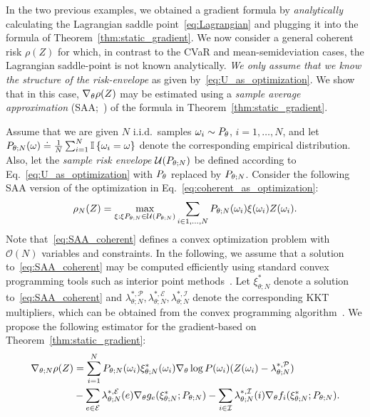 \documentclass{article} %
\newcommand{\citealt}{\cite}
\begin{document}
In the two previous examples, we obtained a gradient formula by \emph{analytically} calculating the Lagrangian saddle point~\eqref{eq:Lagrangian} and plugging it into the formula of Theorem~\ref{thm:static_gradient}. We now consider a general coherent risk $\rho(Z)$ for which, in contrast to the CVaR and mean-semideviation cases, the Lagrangian saddle-point is not known analytically. \emph{We only assume that we know the structure of the risk-envelope} as given by~\eqref{eq:U_as_optimization}.
We show that in this case, $\nabla_{\theta} \rho(Z)$ may be estimated using a \emph{sample average approximation} (SAA;~\citealt{Shapiro2009}) of the formula in Theorem~\ref{thm:static_gradient}.

Assume that we are given $N$ i.i.d.~samples $\omega_i \sim P_{\theta}$, $i=1,\dots,N$, and let $P_{\theta;N}(\omega) \doteq \frac{1}{N}\sum_{i=1}^N \mathbb{I}\left\{ { \omega_i = \omega } \right\}$ denote the corresponding empirical distribution. Also, let the \emph{sample risk envelope} $\mathcal U(P_{\theta;N})$ be defined according to Eq.~\ref{eq:U_as_optimization} with $P_{\theta}$ replaced by $P_{\theta;N}$. Consider the following SAA version of the optimization in Eq.~\ref{eq:coherent_as_optimization}:
%
\begin{equation}\label{eq:SAA_coherent}
\rho_N(Z) = \max_{\xi:\xi P_{\theta;N} \in \mathcal U(P_{\theta;N})} \sum_{i \in 1,\dots,N} P_{\theta;N}(\omega_i) \xi(\omega_i) Z(\omega_i).
\end{equation}
%
Note that~\eqref{eq:SAA_coherent} defines a convex optimization problem with $\mathcal O(N)$ variables and constraints. In the following, we assume that a solution to~\eqref{eq:SAA_coherent} may be computed efficiently using standard convex programming tools such as interior point methods~\cite{boyd2009convex}. Let $\xi^*_{\theta;N}$ denote a solution to~\eqref{eq:SAA_coherent} and $\lambda^{*,\mathcal P}_{\theta;N},\lambda^{*,\mathcal E}_{\theta;N},\lambda^{*,\mathcal I}_{\theta;N}$ denote the corresponding KKT multipliers, which can be obtained from the convex programming algorithm~\cite{boyd2009convex}. We propose the following estimator for the gradient-based on Theorem~\ref{thm:static_gradient}:
%
\vspace{-0.05in}
\begin{align}\label{eq:SAA_gradient}
  \nabla_{\theta;N}{\rho(Z)} &= \sum_{i = 1}^{N} P_{\theta;N}(\omega_i) \xi^*_{\theta;N}(\omega_i) \nabla_{\theta} \log P(\omega_i) (Z(\omega_i) - \lambda^{*,\mathcal P}_{\theta;N}) \\
    & - \sum_{e\in\mathcal E} \lambda^{*,\mathcal E}_{\theta;N}(e) \nabla_{\theta}{g_e(\xi^*_{\theta;N};P_{\theta;N})}\nonumber
     -\sum_{i\in\mathcal I} \lambda^{*,\mathcal I}_{\theta;N}(i) \nabla_{\theta}{f_i(\xi^*_{\theta;N};P_{\theta;N})}.
\end{align}
\end{document}
